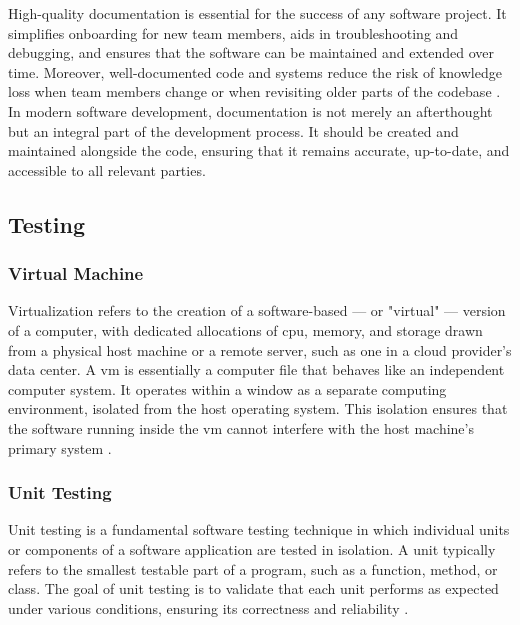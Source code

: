 {High-quality documentation is essential for the success of any software project. It simplifies onboarding for new team members, aids in troubleshooting and debugging, and ensures that the software can be maintained and extended over time. Moreover, well-documented code and systems reduce the risk of knowledge loss when team members change or when revisiting older parts of the codebase \cite{geeksforgeeks:doc}. \\

In modern software development, documentation is not merely an afterthought but an integral part of the development process. It should be created and maintained alongside the code, ensuring that it remains accurate, up-to-date, and accessible to all relevant parties.

\subsection{Testing}
\label{subsec:testing}

\subsubsection*{Virtual Machine}
\label{subsubsec:virtual-machine}

Virtualization refers to the creation of a software-based — or "virtual" — version of a computer, with dedicated allocations of \gls{cpu}, memory, and storage drawn from a physical host machine or a remote server, such as one in a cloud provider's data center. A \gls{vm} is essentially a computer file that behaves like an independent computer system. It operates within a window as a separate computing environment, isolated from the host operating system. This isolation ensures that the software running inside the \gls{vm} cannot interfere with the host machine’s primary system \cite{microsoft:virtual-machine}.

\subsubsection*{Unit Testing}
\label{subsubsec:unit-testing}

Unit testing is a fundamental software testing technique in which individual units or components of a software application are tested in isolation. A unit typically refers to the smallest testable part of a program, such as a function, method, or class. The goal of unit testing is to validate that each unit performs as expected under various conditions, ensuring its correctness and reliability \cite{geeksforgeeks:unit-test}. \\

}
